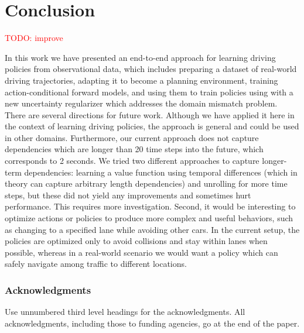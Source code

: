 \documentclass{article} %
\begin{document}
  \section{Conclusion}

  \textcolor{red}{TODO: improve}
  
  In this work we have presented an end-to-end approach for learning driving policies from observational data, which includes preparing a dataset of real-world driving trajectories, adapting it to become a planning environment, training action-conditional forward models, and using them to train policies using with a new uncertainty regularizer which addresses the domain mismatch problem.
  There are several directions for future work.
  Although we have applied it here in the context of learning driving policies, the approach is general and could be used in other domains.
  Furthermore, our current approach does not capture dependencies which are longer than 20 time steps into the future, which corresponds to 2 seconds.
  We tried two different approaches to capture longer-term dependencies: learning a value function using temporal differences (which in theory can capture arbitrary length dependencies) and unrolling for more time steps, but these did not yield any improvements and sometimes hurt performance. This requires more investigation.
  Second, it would be interesting to optimize actions or policies to produce more complex and useful behaviors, such as changing to a specified lane while avoiding other cars.
  In the current setup, the policies are optimized only to avoid collisions and stay within lanes when possible, whereas in a real-world scenario we would want a policy which can safely navigate among traffic to different locations.



\subsubsection*{Acknowledgments}

Use unnumbered third level headings for the acknowledgments. All
acknowledgments, including those to funding agencies, go at the end of the paper.



\end{document}
